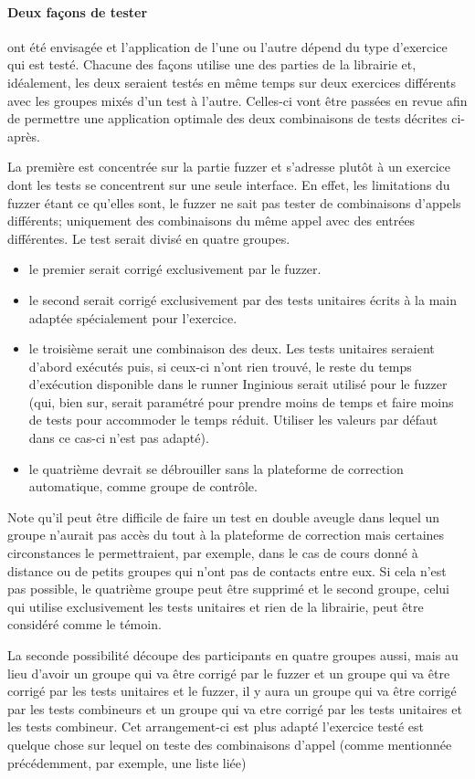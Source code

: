 \documentclass[a4paper]{report}
\begin{document}
\paragraph{Deux façons de tester} ont été envisagée et l'application de l'une ou l'autre dépend du type d'exercice qui est testé.
Chacune des façons utilise une des parties de la librairie et, idéalement, les deux seraient testés en même temps sur deux exercices différents avec les groupes mixés d'un test à l'autre.
Celles-ci vont être passées en revue afin de permettre une application optimale des deux combinaisons de tests décrites ci-après.

La première est concentrée sur la partie fuzzer et s'adresse plutôt à un exercice dont les tests se concentrent sur une seule interface.
En effet, les limitations du fuzzer étant ce qu'elles sont, le fuzzer ne sait pas tester de combinaisons d'appels différents; uniquement des combinaisons du même appel avec des entrées différentes.
Le test serait divisé en quatre groupes.
\begin{itemize}
\item le premier serait corrigé exclusivement par le fuzzer.
\item le second serait corrigé exclusivement par des tests unitaires écrits à la main adaptée spécialement pour l'exercice.
\item le troisième serait une combinaison des deux. Les tests unitaires seraient d'abord exécutés puis, si ceux-ci n'ont rien trouvé, le reste du temps d'exécution disponible dans le runner Inginious serait utilisé pour le fuzzer (qui, bien sur, serait paramétré pour prendre moins de temps et faire moins de tests pour accommoder le temps réduit. Utiliser les valeurs par défaut dans ce cas-ci n'est pas adapté).
\item le quatrième  devrait se débrouiller sans la plateforme de correction automatique, comme groupe de contrôle.
\end{itemize}
Note qu'il peut être difficile de faire un test en double aveugle dans lequel un groupe n'aurait pas accès du tout à la plateforme de correction mais certaines circonstances le permettraient, par exemple, dans le cas de cours donné à distance ou de petits groupes qui n'ont pas de contacts entre eux.
Si cela n'est pas possible, le quatrième groupe peut être supprimé et le second groupe, celui qui utilise exclusivement les tests unitaires et rien de la librairie, peut être considéré comme le témoin.

La seconde possibilité découpe des participants en quatre groupes aussi, mais au lieu d'avoir un groupe qui va être corrigé par le fuzzer et un groupe qui va être corrigé par les tests unitaires et le fuzzer,  il y aura un groupe qui va être corrigé par les tests combineurs et un groupe  qui va etre corrigé par les tests unitaires et les tests combineur.
Cet arrangement-ci est plus adapté l'exercice testé est quelque chose sur lequel on teste des combinaisons d'appel (comme mentionnée précédemment, par exemple, une liste liée)
\end{document}
